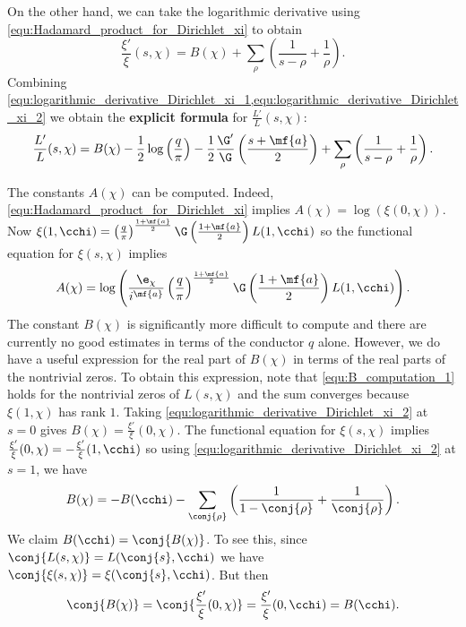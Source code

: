       On the other hand, we can take the logarithmic derivative using \cref{equ:Hadamard_product_for_Dirichlet_xi} to obtain
      \begin{equation}\label{equ:logarithmic_derivative_Dirichlet_xi_2}
        \frac{\xi'}{\xi}(s,\chi) = B(\chi)+\sum_{\rho}\left(\frac{1}{s-\rho}+\frac{1}{\rho}\right).
      \end{equation}
      Combining \cref{equ:logarithmic_derivative_Dirichlet_xi_1,equ:logarithmic_derivative_Dirichlet_xi_2} we obtain the \textbf{explicit formula} for $\frac{L'}{L}(s,\chi)$:
      \[
        \frac{L'}{L}(s,\chi) = B(\chi)-\frac{1}{2}\log\left(\frac{q}{\pi}\right)-\frac{1}{2}\frac{\G'}{\G}\left(\frac{s+\mf{a}}{2}\right)+\sum_{\rho}\left(\frac{1}{s-\rho}+\frac{1}{\rho}\right).
      \]

      The constants $A(\chi)$ can be computed. Indeed, \cref{equ:Hadamard_product_for_Dirichlet_xi} implies $A(\chi) = \log(\xi(0,\chi))$. Now $\xi(1,\cchi) = \left(\frac{q}{\pi}\right)^{\frac{1+\mf{a}}{2}}\G\left(\frac{1+\mf{a}}{2}\right)L(1,\cchi)$ so the functional equation for $\xi(s,\chi)$ implies
      \[
        A(\chi) = \log\left(\frac{\e_{\chi}}{i^{\mf{a}}}\left(\frac{q}{\pi}\right)^{\frac{1+\mf{a}}{2}}\G\left(\frac{1+\mf{a}}{2}\right)L(1,\cchi)\right).
      \]
      The constant $B(\chi)$ is significantly more difficult to compute and there are currently no good estimates in terms of the conductor $q$ alone. However, we do have a useful expression for the real part of $B(\chi)$ in terms of the real parts of the nontrivial zeros. To obtain this expression, note that \cref{equ:B_computation_1} holds for the nontrivial zeros of $L(s,\chi)$ and the sum converges because $\xi(1,\chi)$ has rank $1$. Taking \cref{equ:logarithmic_derivative_Dirichlet_xi_2} at $s = 0$ gives $B(\chi) = \frac{\xi'}{\xi}(0,\chi)$. The functional equation for $\xi(s,\chi)$ implies $\frac{\xi'}{\xi}(0,\chi) = -\frac{\xi'}{\xi}(1,\cchi)$ so using \cref{equ:logarithmic_derivative_Dirichlet_xi_2} at $s = 1$, we have
      \begin{equation}\label{equ:B_chi_computation_1}
        B(\chi) = -B(\cchi)-\sum_{\conj{\rho}}\left(\frac{1}{1-\conj{\rho}}+\frac{1}{\conj{\rho}}\right).
      \end{equation}
      We claim $B(\cchi) = \conj{B(\chi)}$. To see this, since $\conj{L(s,\chi)} = L(\conj{s},\cchi)$ we have $\conj{\xi(s,\chi)} = \xi(\conj{s},\cchi)$. But then
      \[
        \conj{B(\chi)} = \conj{\frac{\xi'}{\xi}(0,\chi)} = \frac{\xi'}{\xi}(0,\cchi) = B(\cchi).
      \]
